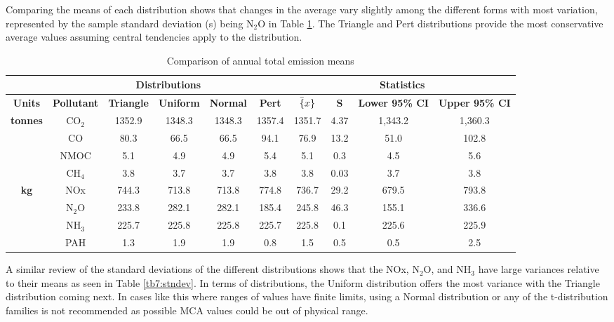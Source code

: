 %
Comparing the means of each distribution shows that changes in the average vary slightly among the different forms with most variation, represented by the sample standard deviation (s) being N$_{2}$O in Table \ref{tb6:compare}.  The Triangle and Pert distributions provide the most conservative average values assuming central tendencies apply to the distribution.
%
\begin{table}[]
\centering
\caption{Comparison of annual total emission means}
\label{tb6:compare}
\begin{tabular}{@{}cccccccccc@{}}
\toprule
 & \multicolumn{5}{c}{\textbf{Distributions}} & \multicolumn{4}{c}{\textbf{Statistics}} \\ \midrule
\textbf{Units} & \textbf{Pollutant} & \textbf{Triangle} & \textbf{Uniform} & \textbf{Normal} & \textbf{Pert} & \textbf{$\bar\{x\}$} & \textbf{S} & \textbf{Lower 95\% CI} & \textbf{Upper 95\% CI} \\ \midrule
\multirow{4}{*}{\textbf{tonnes}} & CO$_{2}$ & 1352.9 & 1348.3 & 1348.3 & 1357.4 & 1351.7 & 4.37 & 1,343.2 & 1,360.3 \\
 & CO & 80.3 & 66.5 & 66.5 & 94.1 & 76.9 & 13.2 & 51.0 & 102.8 \\
 & NMOC & 5.1 & 4.9 & 4.9 & 5.4 & 5.1 & 0.3 & 4.5 & 5.6 \\
 & CH$_{4}$ & 3.8 & 3.7 & 3.7 & 3.8 & 3.8 & 0.03 & 3.7 & 3.8 \\ \midrule
\multirow{4}{*}{\textbf{kg}} & NOx & 744.3 & 713.8 & 713.8 & 774.8 & 736.7 & 29.2 & 679.5 & 793.8 \\
 & N$_{2}$O & 233.8 & 282.1 & 282.1 & 185.4 & 245.8 & 46.3 & 155.1 & 336.6 \\
 & NH$_{3}$ & 225.7 & 225.8 & 225.8 & 225.7 & 225.8 & 0.1 & 225.6 & 225.9 \\
 & PAH & 1.3 & 1.9 & 1.9 & 0.8 & 1.5 & 0.5 & 0.5 & 2.5 \\ \bottomrule
\end{tabular}
\end{table}
%
A similar review of the standard deviations of the different distributions shows that the NOx, N$_{2}$O, and NH$_{3}$ have large variances relative to their means as seen in Table \ref{tb7:stndev}.  In terms of distributions, the Uniform distribution offers the most variance with the Triangle distribution coming next. In cases like this where ranges of values have finite limits, using a Normal distribution or any of the t-distribution families is not recommended as possible MCA values could be out of physical range.
%
